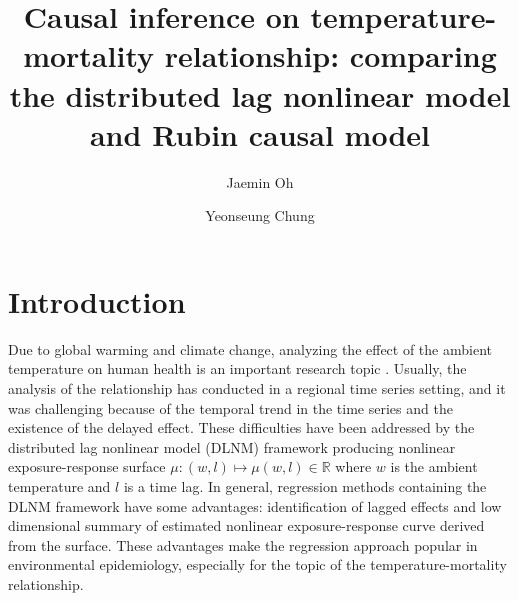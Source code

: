 \documentclass[12pt]{article}
\author[1]{Jaemin Oh}
\author[2]{Yeonseung Chung}
\affil[1,2]{Department of Mathematical Sciences, 
KAIST, Daejeon, South Korea}
\title{
	Causal inference on temperature-mortality relationship: 
	comparing the distributed lag nonlinear model and Rubin causal model
	} %
\begin{document}
\maketitle



\section{Introduction}

Due to global warming and climate change,
analyzing the effect of the ambient temperature on human health is an important research topic
\cite{gasparrini2015, yoonhee2019, temperaturemorbidity}.
Usually, the analysis of the relationship has conducted in a regional time series setting,
and it was challenging because of the temporal trend in the time series and the existence of the delayed effect.
These difficulties have been addressed by 
the distributed lag nonlinear model (DLNM) framework\cite{dlnm2010}
producing nonlinear exposure-response surface
$\mu : (w, l) \mapsto \mu(w,l) \in \mathbb{R}$ where $w$ is the ambient temperature and $l$ is a time lag.
In general, regression methods containing the DLNM framework have some advantages:
identification of lagged effects and
low dimensional summary of estimated nonlinear exposure-response curve derived from the surface.
These advantages make the regression approach popular in environmental epidemiology,
especially for the topic of the temperature-mortality relationship.
\end{document}
